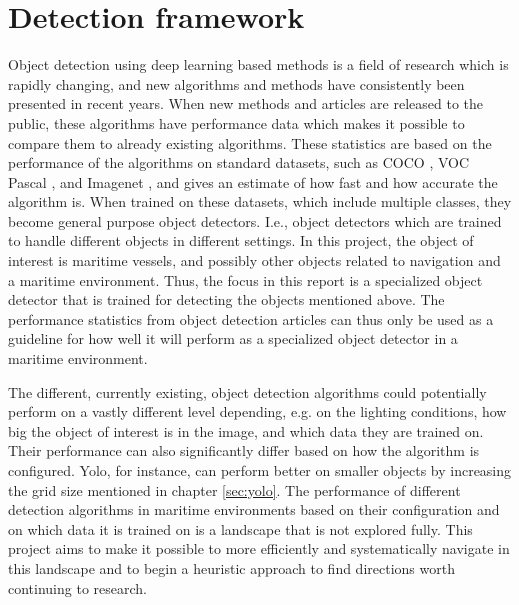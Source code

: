 \section{Detection framework}
Object detection using deep learning based methods is a field of research which is rapidly changing, and new algorithms and methods have consistently been presented in recent years. When new methods and articles are released to the public, these algorithms have performance data which makes it possible to compare them to already existing algorithms. These statistics are based on the performance of the algorithms on standard datasets, such as COCO \citep{COCO}, VOC Pascal \citep{Everingham2007} \citep{Everingham2012}, and Imagenet \citep{Imagenet}, and gives an estimate of how fast and how accurate the algorithm is. When trained on these datasets, which include multiple classes, they become general purpose object detectors. I.e., object detectors which are trained to handle different objects in different settings. In this project, the object of interest is maritime vessels, and possibly other objects related to navigation and a maritime environment. Thus, the focus in this report is a specialized object detector that is trained for detecting the objects mentioned above. The performance statistics from object detection articles can thus only be used as a guideline for how well it will perform as a specialized object detector in a maritime environment. 

\vspace{3mm}

The different, currently existing, object detection algorithms could potentially perform on a vastly different level depending, e.g. on the lighting conditions, how big the object of interest is in the image, and which data they are trained on. Their performance can also significantly differ based on how the algorithm is configured. Yolo, for instance, can perform better on smaller objects by increasing the grid size mentioned in chapter \ref{sec:yolo}. The performance of different detection algorithms in maritime environments based on their configuration and on which data it is trained on is a landscape that is not explored fully. This project aims to make it possible to more efficiently and systematically navigate in this landscape and to begin a heuristic approach to find directions worth continuing to research.

